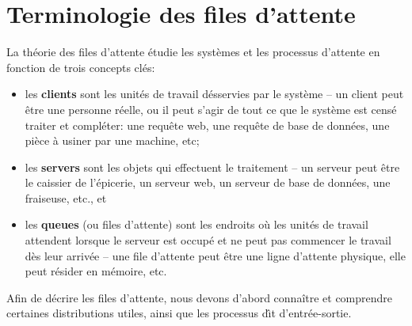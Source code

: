 \section{Terminologie des files d'attente}
La théorie des files d'attente étudie les systèmes et les processus d'attente en fonction de trois concepts clés:
\begin{itemize}
\item les \textbf{clients} sont les unités de travail d\'esservies par le système -- un client peut être une personne réelle, ou il peut s'agir de tout ce que le système est censé traiter et compléter: une requête web, une requête de base de données, une pièce à usiner par une machine, etc;
\item les \textbf{servers} sont les objets qui effectuent le traitement -- un serveur peut être le caissier de l'épicerie, un serveur web, un serveur de base de données, une fraiseuse, etc., et 
\item les \textbf{queues} (ou files d'attente) sont les endroits où les unités de travail attendent lorsque le serveur est occupé et ne peut pas commencer le travail dès leur arrivée -- une file d'attente peut être une ligne d'attente physique, elle peut résider en mémoire, etc. 
\end{itemize}
Afin de décrire les files d'attente, nous devons d'abord connaître et comprendre certaines distributions utiles, ainsi que les processus d\^{\i}t d'entrée-sortie.
